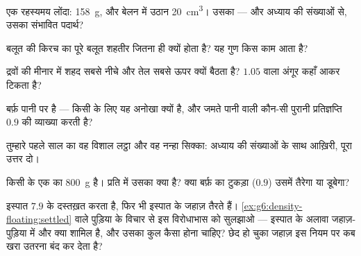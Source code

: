 \begin{exercise}[$\star$]\label{exo:g6:density-floating:4}
एक रहस्यमय लोंदा:  \qty{158}{g}, और बेलन में उठान
\qty{20}{cm^3}। उसका  --- और अध्याय की संख्याओं से, उसका संभावित
पदार्थ?
\end{exercise}

\begin{exercise}[$\star$]\label{exo:g6:density-floating:5}
बलूत की किरच का  पूरे बलूत शहतीर जितना ही क्यों होता है? यह गुण
किस काम आता है?
\end{exercise}

\begin{exercise}[$\star$]\label{exo:g6:density-floating:6}
द्रवों की मीनार में शहद सबसे नीचे और तेल सबसे ऊपर क्यों बैठता है?
$1.05$  वाला अंगूर कहाँ आकर टिकता है?
\end{exercise}

\begin{exercise}[$\star$]\label{exo:g6:density-floating:7}
बर्फ़ पानी पर  है --- किसी  के लिए यह अनोखा क्यों है, और जमते
पानी वाली कौन-सी पुरानी प्रतिज्ञप्ति $0.9$ की व्याख्या करती है?
\end{exercise}

\begin{exercise}[$\star$]\label{exo:g6:density-floating:8}
तुम्हारे पहले साल का वह विशाल लट्ठा और वह नन्हा सिक्का: अध्याय की
संख्याओं के साथ आख़िरी, पूरा उत्तर दो।
\end{exercise}

\begin{exercise}[$\star\star$]\label{exo:g6:density-floating:9}
किसी  के एक  का  \qty{800}{g} है।  प्रति  में उसका  क्या है? क्या बर्फ़ का टुकड़ा ($0.9$) उसमें
तैरेगा या डूबेगा?
\end{exercise}

\begin{exercise}[$\star\star$]\label{exo:g6:density-floating:10}
इस्पात $7.9$ के दस्तख़त करता है, फिर भी इस्पात के जहाज़ तैरते हैं।
\cref{ex:g6:density-floating:settled} वाले पुड़िया के विचार से इस
विरोधाभास को सुलझाओ --- इस्पात के अलावा जहाज़-पुड़िया में और क्या शामिल
है, और उसका कुल  कैसा होना चाहिए? छेद हो चुका जहाज़ इस नियम पर
कब खरा उतरना बंद कर देता है?
\end{exercise}

